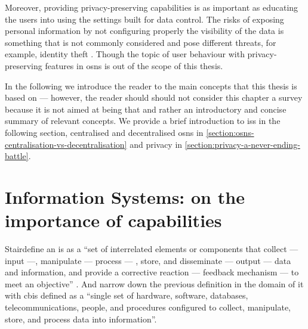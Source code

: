 \documentclass[showtrims, oldfontcommands]{kthesis}
\begin{document}
Moreover, providing privacy-preserving capabilities is as important as educating 
the users into using the settings built for data control. The risks of exposing 
personal information by not configuring properly the visibility of the data is something 
that is not commonly considered and pose different threats, for example, identity 
theft \cite{GrossAH05, BrandtzaegLS10}. Though the topic of user behaviour with 
privacy-preserving features in \acp{osn} is out of the scope of this thesis.

In the following 
we introduce the reader to the main concepts that this thesis is based on --- however,
the reader should should not consider this chapter a survey because it is not aimed 
at being that and rather an introductory and concise summary of relevant concepts. 
We provide a brief introduction to \acp{is} in the following section,
centralised and decentralised \acp{osn} in \cref{section:osns-centralisation-vs-decentralisation}
and privacy in \cref{section:privacy-a-never-ending-battle}.

\section{Information Systems: on the importance of capabilities}
    \label{section:information-systems-on-the-importance-of-capabilities}

Stair\etal define an \ac{is} as a ``set of interrelated elements or components 
that collect --- input ---, manipulate --- process --- , store, and disseminate 
--- output --- data and information, and provide a corrective reaction --- feedback 
mechanism --- to meet an objective'' \cite{StairR15}. And narrow down the previous 
definition in the domain of \ac{it} with \ac{cbis} defined as a ``single set of 
hardware, software, databases, telecommunications, people, and procedures configured 
to collect, manipulate, store, and process data into information''. 
\end{document}
